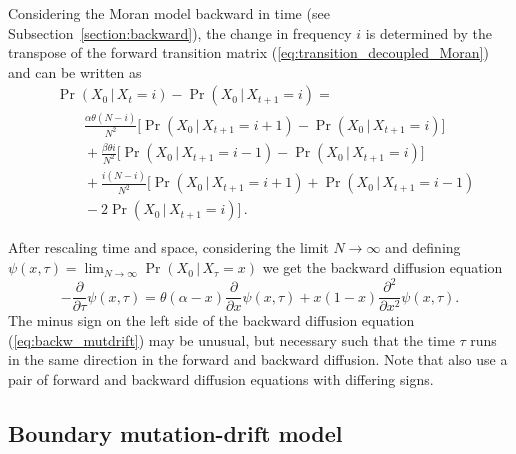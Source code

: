 \documentclass[preprint]{elsarticle}
\newcommand\given{{\,|\,}}
\newcommand\x[1]{\ensuremath{X_{#1}}}
\begin{document}
Considering the Moran model backward in time (see Subsection~\ref{section:backward}), the change in frequency $i$ is determined by the transpose of the forward transition matrix (\ref{eq:transition_decoupled_Moran}) and can be written as
\begin{equation}\label{eq:back_discr_mutation}
\begin{split}
&\Pr(\x{0} \given\x{t}=i)-\Pr(\x{0}\given\x{t+1}=i) = \\
&\qquad \frac{\alpha \theta (N-i)}{N^2} \bigg[\Pr(\x{0}\given\x{t+1}=i+1)-\Pr(\x{0}\given\x{t+1}=i)\bigg]\\
&\qquad+ \frac{\beta \theta i}{N^2} \bigg[\Pr(\x{0}\given\x{t+1}=i-1)-\Pr(\x{0}\given\x{t+1}=i)\bigg]\\
&\qquad+ \frac{i(N-i)}{N^2} \bigg[\Pr(\x{0}\given\x{t+1}=i+1)+\Pr(\x{0}\given\x{t+1}=i-1)\\
&\qquad-2\Pr(\x{0}\given\x{t+1}=i)\bigg]\,.
\end{split}
\end{equation}

After rescaling time and space, considering the limit $N \to \infty$ and defining $\psi(x,\tau)=\lim_{N\to\infty}\Pr(\x{0}\given\x{\tau}=x)$ we get the backward diffusion equation
\begin{equation}\label{eq:backw_mutdrift}
-\frac{\partial}{\partial \tau} \psi(x,\tau) =
    \theta(\alpha-x)\frac{\partial}{\partial x} \psi(x,\tau) +x(1-x)\frac{\partial^2}{\partial x^2}\psi(x,\tau).
\end{equation}
The minus sign on the left side of the backward diffusion equation (\ref{eq:backw_mutdrift}) may be unusual, but necessary such that the time $\tau$ runs in the same direction in the forward and backward diffusion. Note that \citet{Zhao13a} also use a pair of forward and backward diffusion equations with differing signs.


\subsection{Boundary mutation-drift model}
\end{document}
